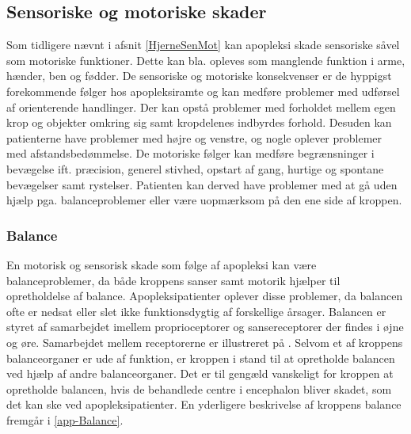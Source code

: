 \subsection{Sensoriske og motoriske skader} %
Som tidligere nævnt i afsnit \ref{HjerneSenMot} kan apopleksi skade sensoriske såvel som motoriske funktioner. Dette kan bla. opleves som manglende funktion i arme, hænder, ben og fødder. De sensoriske og motoriske konsekvenser er de hyppigst forekommende følger hos apopleksiramte og kan medføre problemer med udførsel af orienterende handlinger. Der kan opstå problemer med forholdet mellem egen krop og objekter omkring sig samt kropdelenes indbyrdes forhold. Desuden kan patienterne have problemer med højre og venstre, og nogle oplever problemer med afstandsbedømmelse. De motoriske følger kan medføre  begrænsninger i bevægelse ift. præcision, generel stivhed, opstart af gang, hurtige og spontane bevægelser samt rystelser. Patienten kan derved have problemer med at gå uden hjælp pga. balanceproblemer eller være uopmærksom på den ene side af kroppen. \cite{Sundhed.dk,DSfA2009}

\subsubsection{Balance}
En motorisk og sensorisk skade som følge af apopleksi kan være balanceproblemer, da både kroppens sanser samt motorik hjælper til opretholdelse af balance. Apopleksipatienter oplever disse problemer, da balancen ofte er nedsat eller slet ikke funktionsdygtig af forskellige årsager.\cite{Karnath2003} Balancen er styret af samarbejdet imellem proprioceptorer og sansereceptorer der findes i øjne og øre. Samarbejdet mellem receptorerne er illustreret på . Selvom et af kroppens balanceorganer er ude af funktion, er kroppen i stand til at opretholde balancen ved hjælp af andre balanceorganer. Det er til gengæld vanskeligt for kroppen at opretholde balancen, hvis de behandlede centre i encephalon bliver skadet, som det kan ske ved apopleksipatienter. \cite{Martini2012} En yderligere beskrivelse af kroppens balance fremgår i \ref{app-Balance}.  

